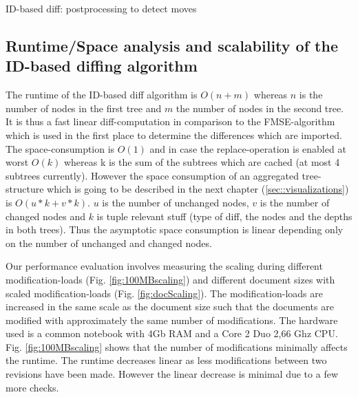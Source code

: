 \begin{algorithm}[Hhtbp]
\BlankLine
{}
\caption{ID-based diff: postprocessing to detect moves}\label{diffPostprocessing}
\end{algorithm}

\subsection{Runtime/Space analysis and scalability of the ID-based diffing algorithm}
The runtime of the ID-based diff algorithm is $O(n+m)$ whereas $n$ is the number of nodes in the first tree and $m$ the number of nodes in the second tree. It is thus a fast linear diff-computation in comparison to the FMSE-algorithm which is used in the first place to determine the differences which are imported. The space-consumption is $O(1)$ and in case the replace-operation is enabled at worst $O(k)$ whereas k is the sum of the subtrees which are cached (at most 4 subtrees currently). However the space consumption of an aggregated tree-structure which is going to be described in the next chapter (\ref{sec::visualizations}) is $O(u*k+v*k)$. $u$ is the number of unchanged nodes, $v$ is the number of changed nodes and $k$ is tuple relevant stuff (type of diff, the nodes and the depths in both trees). Thus the asymptotic space consumption is linear depending only on the number of unchanged and changed nodes.

Our performance evaluation involves measuring the scaling during different modification-loads (Fig. \ref{fig:100MBscaling}) and different document sizes with scaled modification-loads (Fig. \ref{fig:docScaling}). The modification-loads are increased in the same scale as the document size such that the documents are modified with approximately the same number of modifications. The hardware used is a common notebook with 4Gb RAM and a Core 2 Duo 2,66 Ghz CPU. Fig. \ref{fig:100MBscaling} shows that the number of modifications minimally affects the runtime. The runtime decreases linear as less modifications between two revisions have been made. However the linear decrease is minimal due to a few more checks.

